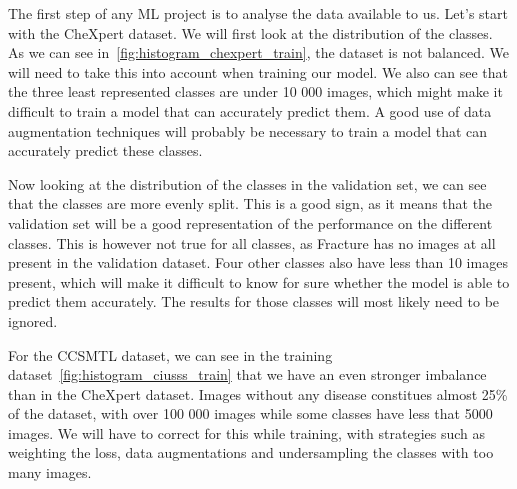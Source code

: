 \documentclass[11pt]{article}
\begin{document}
    The first step of any ML project is to analyse the data available to us. Let's start with the CheXpert dataset.
    We will first look at the distribution of the classes. As we can see
    in~\ref{fig:histogram_chexpert_train}, the dataset is not balanced. We will need to take this into account when
    training our model. We also can see that the three least represented classes are under 10 000 images, which might
    make it difficult to train a model that can accurately predict them. A good use of data augmentation techniques
    will probably be necessary to train a model that can accurately predict these classes.

    Now looking at the distribution of the classes in the validation set, we can see that the classes are more evenly
    split. This is a good sign, as it means that the validation set will be a good representation of the performance
    on the different classes. This is however not true for all classes, as Fracture has no images at all present in
    the validation dataset. Four other classes also have less than 10 images present, which will make it difficult to
    know for sure whether the model is able to predict them accurately. The results for those classes will most
    likely need to be ignored.

    For the CCSMTL dataset, we can see in the training dataset~\ref{fig:histogram_ciusss_train} that we have an even stronger imbalance than in the
    CheXpert dataset. Images without any disease constitues almost 25\% of the dataset, with over 100 000 images
    while some classes have less that 5000 images. We will have to correct for this while training, with strategies
    such as weighting the loss, data augmentations and undersampling the classes with too many images.
\end{document}
